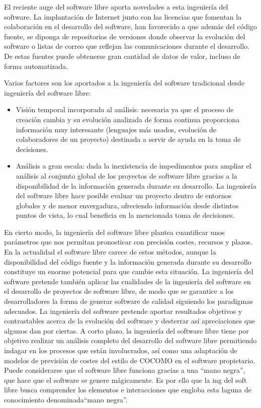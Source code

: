 El reciente auge del software libre aporta novedades a esta ingeniería del software.
La implantación de Internet junto con las licencias que fomentan la colaboración
en el desarrollo del software, han favorecido a que además del código fuente,
se diponga de repositorios de versiones donde observar la evolución del software
o listas de correo que reflejan las comunicaciones durante el desarrollo.
De estas fuentes puede obtenerse gran cantidad de datos de valor,
incluso de forma automatizada.

Varios factores son los aportados a la ingeniería del software tradicional
desde ingeniería del software libre:
\begin{itemize}
\item
Visión temporal incorporada al análisis: necesaria ya que el proceso de creación
cambia y su evolución analizada de forma continua proporciona información
muy interesante (lenguajes más usados, evolución de colaboradores de un proyecto)
destinada a servir de ayuda en la toma de decisiones.
\item
Análisis a gran escala: dada la inexistencia de impedimentos para ampliar
el análisis al conjunto global de los proyectos de software libre gracias a la
disponibilidad de la información generada durante su desarrollo.
La ingeniería del software libre hace posible evaluar un proyecto
dentro de entornos globales y de menor envergadura, ofreciendo información desde
distintos puntos de vista, lo cual beneficia en la mencionada toma de decisiones.
\end{itemize}

En cierto modo, la ingeniería del software libre plantea cuantificar unos
parámetros que nos permitan pronosticar con precisión costes, recursos y plazos.
En la actualidad el software libre carece de estos métodos, aunque la
disponibilidad del código fuente y la información generada durante su desarrollo
constituye un enorme potencial para que cambie esta situación.
La ingeniería del software pretende también aplicar las cualidades de la
ingeniería del software en el desarrollo de proyectos de software libre,
de modo que se garantice a los desarrolladores la forma de generar
software de calidad siguiendo los paradigmas adecuados.
La ingeniería del software pretende aportar resultados objetivos y contrastables
acerca de la evolución del software y desterrar así apreciaciones que algunos dan
por ciertas.
A corto plazo, la ingeniería del software libre tiene por objetivo realizar
un análisis completo del desarrollo del software libre permitiendo indagar
en los procesos
que están involucrados, así como una adaptación de modelos de previsión de
costes del estilo de COCOMO en el software propietario.
Puede considerarse que el software libre funciona gracias a una ``mano negra'',
que hace que el software se genere mágicamente. Es por ello que la ing del 
soft libre busca comprender los elementos e interacciones que engloba esta
laguna de conocimiento denominada``mano negra''.

